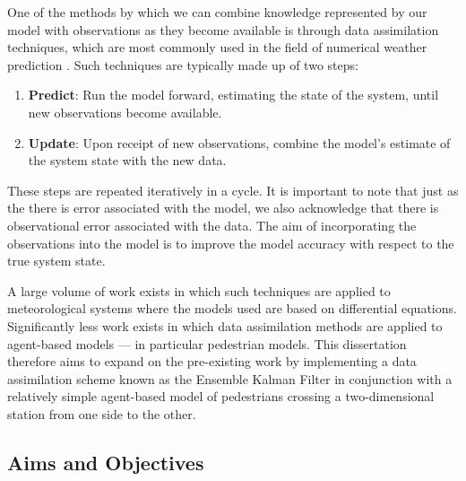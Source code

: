 One of the methods by which we can combine knowledge represented by our model
with observations as they become available is through data assimilation
techniques, which are most commonly used in the field of numerical weather
prediction \citep{kalnay2003atmospheric}.
Such techniques are typically made up of two steps:
\begin{enumerate}
    \item \textbf{Predict}: Run the model forward, estimating the state of the system,
    until new observations become available.
    \item \textbf{Update}: Upon receipt of new observations, combine the model's estimate
    of the system state with the new data.
\end{enumerate}
These steps are repeated iteratively in a cycle.
It is important to note that just as the there is error associated with the
model, we also acknowledge that there is observational error associated with the
data.
The aim of incorporating the observations into the model is to improve the model
accuracy with respect to the true system state.

A large volume of work exists in which such techniques are applied to
meteorological systems where the models used are based on differential
equations.
Significantly less work exists in which data assimilation methods are applied to
agent-based models --- in particular pedestrian models.
This dissertation therefore aims to expand on the pre-existing work by
implementing a data assimilation scheme known as the Ensemble Kalman Filter in
conjunction with a relatively simple agent-based model of pedestrians crossing a
two-dimensional station from one side to the other.

\subsection{Aims and Objectives}\label{sub:intro:aims}

